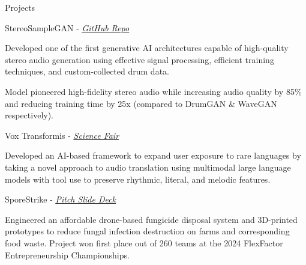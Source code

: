 \documentclass[
  10pt, %
]{resume}
\begin{document}
\begin{rSection}{Projects}

  
    \begin{rSubsection}{StereoSampleGAN - \textit{\underline{\href{https://github.com/shuklabhay/stereo-sample-gan}{GitHub Repo}}}}{}{}{}
        
      \item Developed one of the first generative AI architectures capable of high-quality stereo audio generation using effective signal processing, efficient training techniques, and custom-collected drum data.
          
      \item Model pioneered high-fidelity stereo audio while increasing audio quality by 85\% and reducing training time by 25x (compared to DrumGAN \& WaveGAN respectively).
          
    \end{rSubsection}
        
    \begin{rSubsection}{Vox Transformis - \textit{\underline{\href{https://science-fair.org/}{Science Fair}}}}{}{}{}
        
      \item Developed an AI-based framework to expand user exposure to rare languages by taking a novel approach to audio translation using multimodal large language models with tool use to preserve rhythmic, literal, and melodic features.
          
    \end{rSubsection}
        
    \begin{rSubsection}{SporeStrike - \textit{\underline{\href{https://shuklabhay.github.io/static/projects/sporestrike/FlexFactor_SporeStrike_pitch.pdf}{Pitch Slide Deck}}}}{}{}{}
        
      \item Engineered an affordable drone-based fungicide disposal system and 3D-printed prototypes to reduce fungal infection destruction on farms and corresponding food waste. Project won first place out of 260 teams at the 2024 FlexFactor Entrepreneurship Championships.
          
    \end{rSubsection}
        

\end{rSection}
    
\end{document}
